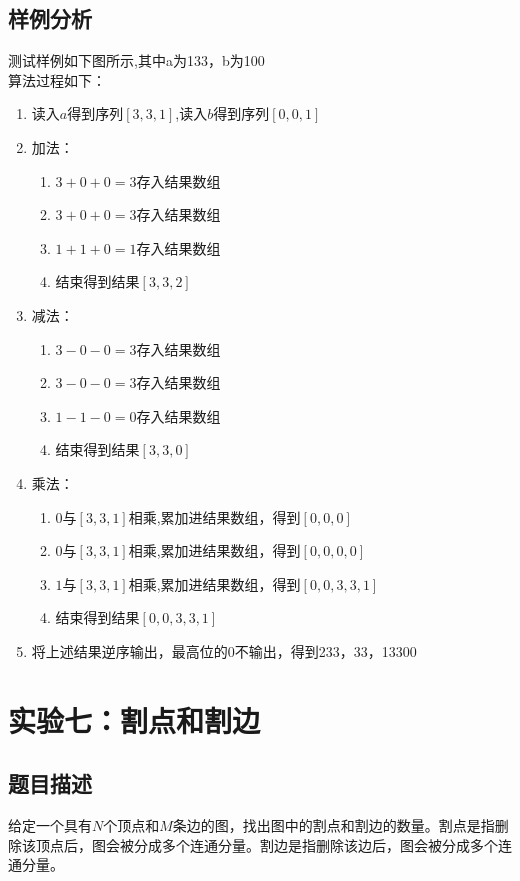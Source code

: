\documentclass[UTF8,a4paperdui, %
]{ctexart}
\begin{document}
\subsection{样例分析}
测试样例如下图所示,其中a为133，b为100
\\
算法过程如下：
\begin{enumerate}
    \item 读入$a$得到序列$[3,3,1]$,读入$b$得到序列$[0,0,1]$
    \item 加法：\begin{enumerate}
        \item $3+0+0=3$存入结果数组
        \item $3+0+0=3$存入结果数组
        \item $1+1+0=1$存入结果数组
        \item 结束得到结果$[3,3,2]$
    \end{enumerate}
    \item 减法：\begin{enumerate}
        \item $3-0-0=3$存入结果数组
        \item $3-0-0=3$存入结果数组
        \item $1-1-0=0$存入结果数组
        \item 结束得到结果$[3,3,0]$
    \end{enumerate}
    \item 乘法：\begin{enumerate}
        \item $0$与$[3,3,1]$相乘,累加进结果数组，得到$[0,0,0]$
        \item $0$与$[3,3,1]$相乘,累加进结果数组，得到$[0,0,0,0]$
        \item $1$与$[3,3,1]$相乘,累加进结果数组，得到$[0,0,3,3,1]$
        \item 结束得到结果$[0,0,3,3,1]$
    \end{enumerate}
    \item 将上述结果逆序输出，最高位的0不输出，得到233，33，13300
\end{enumerate}

\newpage
\section{实验七：割点和割边}

\subsection{题目描述}
给定一个具有$N$个顶点和$M$条边的图，找出图中的割点和割边的数量。割点是指删除该顶点后，图会被分成多个连通分量。割边是指删除该边后，图会被分成多个连通分量。
\end{document}
